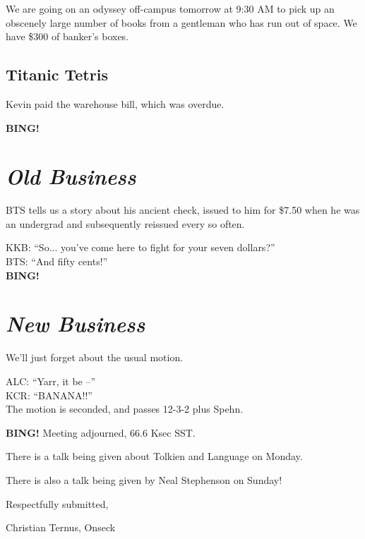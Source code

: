 \documentclass[10pt]{article}
\newcommand{\bing}{{\bf BING!} }
\newcommand{\goto}[1]{\bing \vskip 12pt \section*{{\em{#1}}}}
\newcommand{\ps}{ plus Spehn\xspace}
\begin{document}
We are going on an odyssey off-campus tomorrow at 9:30 AM to pick up
an obscenely large number of books from a gentleman who has run out of
space.  We have \$300 of banker's boxes.

\subsection*{Titanic Tetris}

Kevin paid the warehouse bill, which was overdue. 

\goto{Old Business}

BTS tells us a story about his ancient check, issued to him for \$7.50
when he was an undergrad and subsequently reissued every so often.

KKB: ``So... you've come here to fight for your seven dollars?''\\
BTS: ``And fifty cents!''\\

\goto{New Business}

We'll just forget about the usual motion.

ALC: ``Yarr, it be --''\\
KCR: ``BANANA!!''\\
The motion is seconded, and passes 12-3-2 \ps.

\bing
\noindent
Meeting adjourned, 66.6 Ksec SST.

There is a talk being given about Tolkien and Language on Monday.

There is also a talk being given by Neal Stephenson on Sunday!

\vspace{18pt}

\centerline{Respectfully submitted,}
\centerline{Christian Ternus, Onseck}
\end{document}
